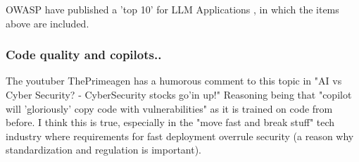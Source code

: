\documentclass[
	letterpaper, %
	10pt, %
	unnumberedsections, %
	twoside, %
]{APAAssignment}
\begin{document}
OWASP have published a 'top 10' for LLM Applications \cite{OWASP-Top10-LLM}, in which the items above are included.

\subsubsection{Code quality and copilots..} The youtuber ThePrimeagen has a humorous comment to this topic in \cite{ThePrimaegenCyberStocksUp} "AI vs Cyber Security? - CyberSecurity stocks go'in up!" Reasoning being that "copilot will 'gloriously' copy code with vulnerabilities" as it is trained on code from before. I think this is true, especially in the "move fast and break stuff" tech industry where requirements for fast deployment overrule security (a reason why standardization and regulation is important).    




\clearpage
\printbibliography %





\appendix
\end{document}
